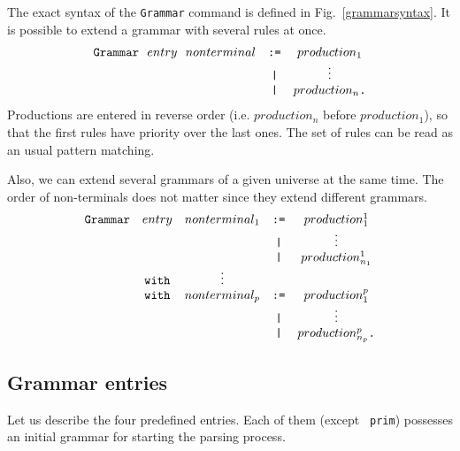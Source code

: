 The exact syntax of the {\tt Grammar} command is defined
in Fig.~\ref{grammarsyntax}.
It is possible to extend a grammar with several rules at once.
$$
\begin{array}{rcc}
\verb+Grammar+~~entry~~nonterminal
        & \verb+:=+ & production_1 \\
        & \verb+|+  & \vdots    \\
        & \verb+|+  & production_n \verb+.+ \\
\end{array}
$$
Productions are entered in reverse order (i.e. $production_n$ before
$production_1$), so that the first rules have priority over the last
ones. The set of rules can be read as an usual pattern matching.

\noindent Also, we can extend several grammars of a given universe at
the same time. The order of non-terminals does not matter since they
extend different grammars.
$$
\begin{array}{rcccc}
\verb+Grammar+ & entry & nonterminal_1
                         & \verb+:=+ & production_1^1 \\
               &&        & \verb+|+  & \vdots    \\         
               &&        & \verb+|+  & production_{n_1}^1  \\
               & \verb+with+ & \vdots  && \\
               & \verb+with+ & nonterminal_p
                         & \verb+:=+ & production_1^p \\
               &&        & \verb+|+  & \vdots    \\         
               &&        & \verb+|+  & production_{n_p}^p \verb+.+ \\ 
\end{array}
$$


\subsection{Grammar entries}
\label{predefined-grammars}

Let us describe the four predefined entries. Each of them (except {\tt
prim}) possesses an initial grammar for starting the parsing process.

